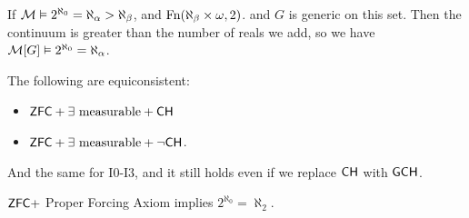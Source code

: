 \documentclass{article}
\begin{document}
    If $\mathcal{M} \vDash 2^{\aleph_{0}} = \aleph_{\alpha} > \aleph_{\beta}$, and $\operatorname{Fn}(\aleph_{\beta} \times \omega, 2)$. and $G$ is generic on this set. Then the continuum is greater than the number of reals we add, so we have $\mathcal{M}[G] \vDash 2^{\aleph_{0}} = \aleph_{\alpha}$.
    \begin{remark*}
        The following are equiconsistent: \begin{itemize}
            \item $\mathsf{ZFC} + \exists \text{ measurable} + \mathsf{CH}$
            \item $\mathsf{ZFC} + \exists \text{ measurable} + \neg \mathsf{CH}$.
        \end{itemize}
        And the same for I0-I3, and it still holds even if we replace $\mathsf{CH}$ with $\mathsf{GCH}$.
    \end{remark*}
    \begin{remark*}
        $\mathsf{ZFC} + $ Proper Forcing Axiom implies $2^{\aleph_{0}} = \aleph_{2}$.
    \end{remark*}
    \newlec
\end{document}
